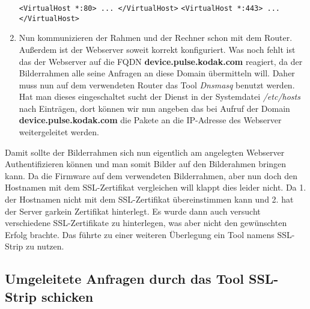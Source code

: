 \begin{flushleft}
\begin{enumerate}
      \verb|<VirtualHost *:80> ... </VirtualHost>|
      \verb|<VirtualHost *:443> ... </VirtualHost>|
      \item Nun kommunizieren der Rahmen und der Rechner schon mit dem Router. Außerdem ist der Webserver soweit korrekt konfiguriert. Was noch fehlt ist das der Webserver auf die FQDN \textbf{device.pulse.kodak.com} reagiert, da der Bilderrahmen alle seine Anfragen an diese Domain übermitteln will. Daher muss nun auf dem verwendeten Router das Tool \textit{Dnsmasq} benutzt werden. Hat man dieses eingeschaltet sucht der Dienst in der Systemdatei \textit{/etc/hosts} nach Einträgen, dort können wir nun angeben das bei Aufruf der Domain \textbf{device.pulse.kodak.com} die Pakete an die IP-Adresse des Webserver weitergeleitet werden.
    \end{enumerate}
    Damit sollte der Bilderrahmen sich nun eigentlich am angelegten Webserver Authentifizieren können und man somit Bilder auf den Bilderahmen bringen kann. Da die Firmware auf dem verwendeten Bilderrahmen, aber nun doch den Hostnamen mit dem SSL-Zertifikat vergleichen will klappt dies leider nicht. Da 1. der Hostnamen nicht mit dem SSL-Zertifikat übereinstimmen kann und 2. hat der Server garkein Zertifikat hinterlegt. Es wurde dann auch versucht verschiedene SSL-Zertifikate zu hinterlegen, was aber nicht den gewünschten Erfolg brachte. Das führte zu einer weiteren Überlegung ein Tool namens SSL-Strip zu nutzen.
  \subsection{Umgeleitete Anfragen durch das Tool SSL-Strip schicken}
    
\end{flushleft}